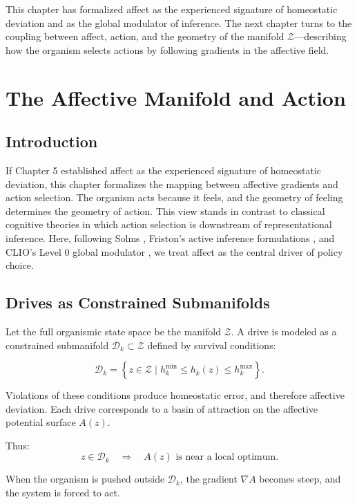 \documentclass[12pt,oneside]{book}
\theoremstyle{plain}
\theoremstyle{definition}
\let\citep\parencite
\begin{document}
This chapter has formalized affect as the experienced signature of
homeostatic deviation and as the global modulator of inference.
The next chapter turns to the coupling between affect, action, and the
geometry of the manifold $\mathcal{Z}$—describing how the organism selects
actions by following gradients in the affective field.

\chapter{The Affective Manifold and Action}

\section{Introduction}

If Chapter 5 established affect as the experienced signature of
homeostatic deviation, this chapter formalizes the mapping between
affective gradients and action selection.
The organism acts because it feels, and the geometry of feeling
determines the geometry of action.
This view stands in contrast to classical cognitive theories in which
action selection is downstream of representational inference.
Here, following Solms \citep{solms2021hidden}, Friston’s active inference
formulations \citep{friston2017active}, and CLIO’s Level 0 global
modulator \citep{cheng2025cognitive}, we treat affect as the central driver
of policy choice.

\section{Drives as Constrained Submanifolds}

Let the full organismic state space be the manifold $\mathcal{Z}$.
A drive is modeled as a constrained submanifold
$\mathcal{D}_k \subset \mathcal{Z}$
defined by survival conditions:

\[
\mathcal{D}_k = \left\{ z \in \mathcal{Z} \;\big|\;
h_k^{\min} \leq h_k(z) \leq h_k^{\max} \right\}.
\]

Violations of these conditions produce homeostatic error, and therefore
affective deviation.
Each drive corresponds to a basin of attraction on the affective potential
surface $A(z)$.

Thus:
\[
z \in \mathcal{D}_k \quad\Rightarrow\quad A(z) \text{ is near a local optimum}.
\]

When the organism is pushed outside $\mathcal{D}_k$, the gradient
$\nabla A$ becomes steep, and the system is forced to act.
\end{document}
